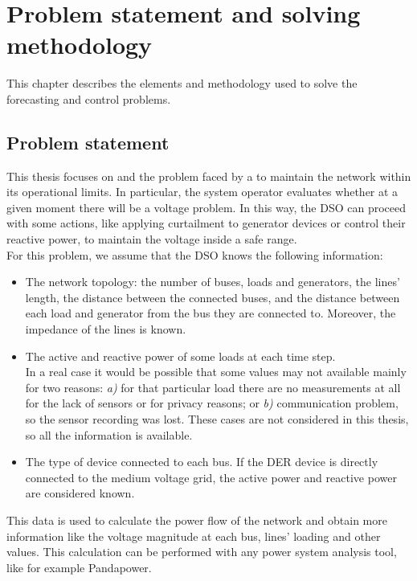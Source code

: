 \chapter{Problem statement and solving methodology}
\label{ch4}
This chapter describes the elements and methodology used to solve the forecasting and control problems.

\section{Problem statement}
\label{sec:4ps}
This thesis focuses on  and the problem faced by a  to maintain the network within its operational limits. In particular, the system operator evaluates whether at a given moment there will be a voltage problem. In this way, the \gls{DSO} can proceed with some actions, like applying curtailment to generator devices or control their reactive power, to maintain the voltage inside a safe range.\\

For this problem, we assume that the \gls{DSO} knows the following information:
\begin{itemize}
    \item The network topology: the number of buses, loads and generators, the lines' length, the distance between the connected buses, and the distance between each load and generator from the bus they are connected to. Moreover, the impedance of the lines is known.
    
    \item The active and reactive power of some loads at each time step. \\
    In a real case it would be possible that some values may not available mainly for two reasons: \emph{a)} for that particular load there are no measurements at all for the lack of sensors or for privacy reasons; or \emph{b)} communication problem, so the sensor recording was lost. These cases are not considered in this thesis, so all the information is available.
    
    \item The type of  device connected to each bus. If the \gls{DER} device is directly connected to the medium voltage grid, the active power and reactive power are considered known. 
\end{itemize}

This data is used to calculate the power flow of the network and obtain more information like the voltage magnitude at each bus, lines' loading and other values. This calculation can be performed with any power system analysis tool, like for example Pandapower.\\

